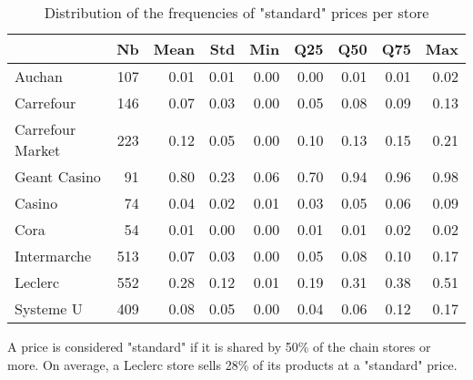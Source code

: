 \documentclass[english]{article}
\begin{document}
\begin{table}[H]
\begin{threeparttable}
\renewcommand{\arraystretch}{0.7}%
\caption{Distribution of the frequencies of "standard" prices per store}\label{tab:qlmc_store_freq_50}
\small
\begin{tabular}{lrrrrrrrr}
\toprule
\toprule
{}                &  Nb &  Mean &  Std &  Min &  Q25 &  Q50 &  Q75 &  Max \\
\midrule
Auchan            & 107 &  0.01 & 0.01 & 0.00 & 0.00 & 0.01 & 0.01 & 0.02 \\
Carrefour         & 146 &  0.07 & 0.03 & 0.00 & 0.05 & 0.08 & 0.09 & 0.13 \\
Carrefour Market  & 223 &  0.12 & 0.05 & 0.00 & 0.10 & 0.13 & 0.15 & 0.21 \\
Geant Casino      &  91 &  0.80 & 0.23 & 0.06 & 0.70 & 0.94 & 0.96 & 0.98 \\
Casino            &  74 &  0.04 & 0.02 & 0.01 & 0.03 & 0.05 & 0.06 & 0.09 \\
Cora              &  54 &  0.01 & 0.00 & 0.00 & 0.01 & 0.01 & 0.02 & 0.02 \\
Intermarche       & 513 &  0.07 & 0.03 & 0.00 & 0.05 & 0.08 & 0.10 & 0.17 \\
Leclerc           & 552 &  0.28 & 0.12 & 0.01 & 0.19 & 0.31 & 0.38 & 0.51 \\
Systeme U         & 409 &  0.08 & 0.05 & 0.00 & 0.04 & 0.06 & 0.12 & 0.17 \\
\bottomrule
\bottomrule
\end{tabular}
\begin{tablenotes}
      \small
      \item A price is considered "standard" if it is shared by 50\% of the chain stores or more. On average, a Leclerc store sells 28\% of its products at a "standard" price.
\end{tablenotes}
\end{threeparttable}
\end{table}
\end{document}
